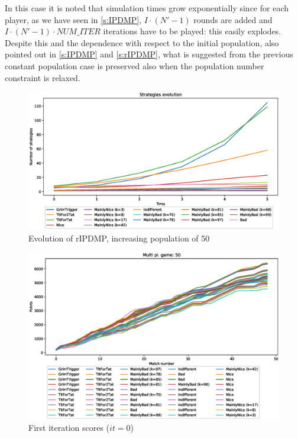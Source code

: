\documentclass[journal,a4paper,10pt,twoside]{IEEEtran} %
\begin{document}
In this case it is noted that simulation times grow exponentially since for each player, as we have seen in \autoref{s:IPDMP}, $I\cdot(N'-1)$ rounds are added and $I\cdot(N'-1)\cdot{NUM\_ITER}$ iterations have to be played: this easily explodes. Despite this and the dependence with respect to the initial population, also pointed out in \autoref{s:IPDMP} and \autoref{s:rIPDMP}, what is suggested from the previous constant population case is preserved also when the population number constraint is relaxed.

\begin{figure}[!ht]
    \centering
    \includegraphics[width=1\columnwidth]{../img/ripdmp-incr/ripdmp-evolution-increasing-pop-50}
    \caption{Evolution of rIPDMP, increasing population of 50}
    \label{fig:incrR}
\end{figure}

\begin{figure}[!ht]
    \centering
    \includegraphics[width=1\columnwidth]{../img/ripdmp-incr/ripdmp-scores-increasing-pop-50-r0}
    \caption{First iteration scores ($it=0$)}
    \label{fig:incrFI}
\end{figure}
\end{document}

